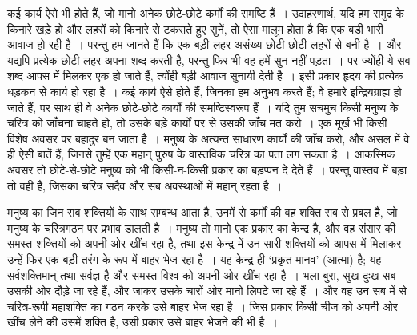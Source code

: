 कई कार्य ऐसे भी होते हैं, जो मानो अनेक छोटे-छोटे कर्मों की समष्टि हैं~। उदाहरणार्थ, यदि हम समुद्र के किनारे खड़े हो और लहरों को किनारे से टकराते हुए सुनें, तो ऐसा मालूम होता है कि एक बड़ी भारी आवाज हो रही है~। परन्तु हम जानते हैं कि एक बड़ी लहर असंख्य छोटी-छोटी लहरों से बनी है~। और यद्यपि प्रत्येक छोटी लहर अपना शब्द करती है, परन्तु फिर भी वह हमें सुन नहीं पड़ता~। पर ज्योंही ये सब शब्द आपस में मिलकर एक हो जाते हैं, त्योंही बड़ी आवाज सुनायी देती है~। इसी प्रकार हृदय की प्रत्येक धड़कन से कार्य हो रहा है~। कई कार्य ऐसे होते हैं, जिनका हम अनुभव करते हैं; वे हमारे इन्द्रियग्राह्य हो जाते हैं, पर साथ ही वे अनेक छोटे-छोटे कार्यों की समष्टिस्वरूप हैं~। यदि तुम सचमुच किसी मनुष्य के चरित्र को जाँचना चाहते हो, तो उसके बड़े कार्यों पर से उसकी जाँच मत करो~। एक मूर्ख भी किसी विशेष अवसर पर बहादुर बन जाता है~। मनुष्य के अत्यन्त साधारण कार्यों की जाँच करो, और असल में वे ही ऐसी बातें हैं, जिनसे तुम्हें एक महान् पुरुष के वास्तविक चरित्र का पता लग सकता है~। आकस्मिक अवसर तो छोटे-से-छोटे मनुष्य को भी किसी-न-किसी प्रकार का बड़प्पन दे देते हैं~। परन्तु वास्तव में बड़ा तो वही है, जिसका चरित्र सदैव और सब अवस्थाओं में महान् रहता है~।

मनुष्य का जिन सब शक्तियों के साथ सम्बन्ध आता है, उनमें से कर्मों की वह शक्ति सब से प्रबल है, जो मनुष्य के चरित्रगठन पर प्रभाव डालती है~। मनुष्य तो मानो एक प्रकार का केन्द्र है, और वह संसार की समस्त शक्तियों को अपनी ओर खींच रहा है, तथा इस केन्द्र में उन सारी शक्तियों को आपस में मिलाकर उन्हें फिर एक बड़ी तरंग के रूप में बाहर भेज रहा है~। यह केन्द्र ही ‘प्रकृत मानव’ (आत्मा) है; यह सर्वशक्तिमान् तथा सर्वज्ञ है और समस्त विश्व को अपनी ओर खींच रहा है~। भला-बुरा, सुख-दुःख सब उसकी ओर दौड़े जा रहे हैं, और जाकर उसके चारों ओर मानो लिपटे जा रहे हैं~। और वह उन सब में से चरित्र-रूपी महाशक्ति का गठन करके उसे बाहर भेज रहा है~। जिस प्रकार किसी चीज को अपनी ओर खींच लेने की उसमें शक्ति है, उसी प्रकार उसे बाहर भेजने की भी है~।

